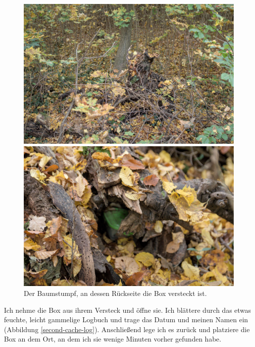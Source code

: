\begin{figure}[H]
    \centering
    \begin{minipage}{.5\textwidth}
        \centering
        \includegraphics[width=.95\linewidth]{figures/geocaching/second/IMG_3116.jpg}
    \end{minipage}%
    \begin{minipage}{.5\textwidth}
        \centering
        \includegraphics[width=.95\linewidth]{figures/geocaching/second/IMG_3110.jpg}
    \end{minipage}
    \caption{Der Baumstumpf, an dessen Rückseite die Box versteckt ist.}

\end{figure}

Ich nehme die Box aus ihrem Versteck und öffne sie. Ich blättere durch das etwas feuchte, leicht gammelige Logbuch und trage das Datum und meinen Namen ein (Abbildung \ref{second-cache-log}). Anschließend lege ich es zurück und platziere die Box an dem Ort, an dem ich sie wenige Minuten vorher gefunden habe.

